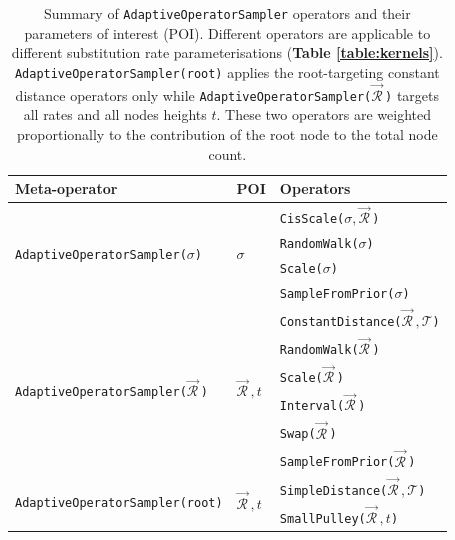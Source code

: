 \documentclass[10pt,letterpaper]{article}
\begin{document}
\begin{table}[h!]
\centering
\begin{tabular}{l l l} 
 Meta-operator & POI & Operators \\
\hline
 \multirow{4}{*}{\texttt{AdaptiveOperatorSampler($\sigma$)}} & \multirow{4}{*}{$\sigma$} & \texttt{CisScale($\sigma, \vec{\mathcal{R}}^{\,}$)} \\ 
 && \texttt{RandomWalk($\sigma$)}  \\
 && \texttt{Scale($\sigma$)}  \\
 && \texttt{SampleFromPrior($\sigma$)}  \\
 \hline
  \multirow{6}{*}{\texttt{AdaptiveOperatorSampler($\vec{\mathcal{R}}^{\,}$)}} & \multirow{6}{*}{$\vec{\mathcal{R}}^{\,}, t$} & \texttt{ConstantDistance($\vec{\mathcal{R}}^{\,}, \mathcal{T}$)}   \\ 
&& \texttt{RandomWalk($\vec{\mathcal{R}}^{\,}$)}  \\
&& \texttt{Scale($\vec{\mathcal{R}}^{\,}$)}   \\
&& \texttt{Interval($\vec{\mathcal{R}}^{\,}$)}   \\
&& \texttt{Swap($\vec{\mathcal{R}}^{\,}$)}  \\
&& \texttt{SampleFromPrior($\vec{\mathcal{R}}^{\,}$)} \\
 \hline
   \multirow{2}{*}{\texttt{AdaptiveOperatorSampler(root)}} & \multirow{2}{*}{$\vec{\mathcal{R}}^{\,}, t$} & \texttt{SimpleDistance($\vec{\mathcal{R}}^{\,}, \mathcal{T}$)}  \\ 
&&  \texttt{SmallPulley($\vec{\mathcal{R}}^{\,}, t$)}  \\
\end{tabular}
\caption{Summary of \texttt{AdaptiveOperatorSampler} operators and their parameters of interest (POI).
Different operators are applicable to different substitution rate parameterisations (\textbf{Table \ref{table:kernels}}). 
\texttt{AdaptiveOperatorSampler(root)} applies the root-targeting constant distance operators only \cite{zhang2020improving} while \texttt{AdaptiveOperatorSampler($\vec{\mathcal{R}}^{\,}$)} targets all rates and all nodes heights $t$. 
These two operators are weighted proportionally to the contribution of the root node to the total node count. }
\label{table:adaptiveSampling}
\end{table}




\end{document}
